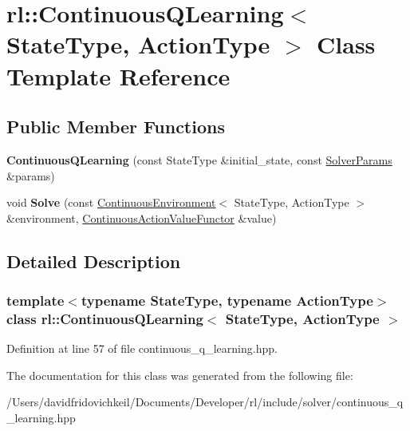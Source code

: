 \hypertarget{classrl_1_1_continuous_q_learning}{}\section{rl\+:\+:Continuous\+Q\+Learning$<$ State\+Type, Action\+Type $>$ Class Template Reference}
\label{classrl_1_1_continuous_q_learning}
\subsection*{Public Member Functions}
\begin{DoxyCompactItemize}
\item 
\hypertarget{classrl_1_1_continuous_q_learning_acad11cd674054dda55ccb9a325cc5c63}{}\label{classrl_1_1_continuous_q_learning_acad11cd674054dda55ccb9a325cc5c63} 
{\bfseries Continuous\+Q\+Learning} (const State\+Type \&initial\+\_\+state, const \hyperlink{structrl_1_1_solver_params}{Solver\+Params} \&params)
\item 
\hypertarget{classrl_1_1_continuous_q_learning_a861b4ad3f8d73e9140b6f52579668390}{}\label{classrl_1_1_continuous_q_learning_a861b4ad3f8d73e9140b6f52579668390} 
void {\bfseries Solve} (const \hyperlink{classrl_1_1_continuous_environment}{Continuous\+Environment}$<$ State\+Type, Action\+Type $>$ \&environment, \hyperlink{structrl_1_1_continuous_action_value_functor}{Continuous\+Action\+Value\+Functor} \&value)
\end{DoxyCompactItemize}


\subsection{Detailed Description}
\subsubsection*{template$<$typename State\+Type, typename Action\+Type$>$\newline
class rl\+::\+Continuous\+Q\+Learning$<$ State\+Type, Action\+Type $>$}



Definition at line 57 of file continuous\+\_\+q\+\_\+learning.\+hpp.



The documentation for this class was generated from the following file\+:\begin{DoxyCompactItemize}
\item 
/\+Users/davidfridovichkeil/\+Documents/\+Developer/rl/include/solver/continuous\+\_\+q\+\_\+learning.\+hpp\end{DoxyCompactItemize}

